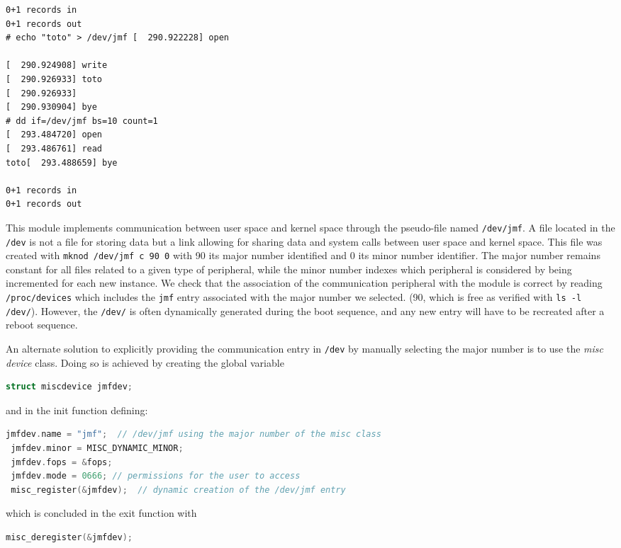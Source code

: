 \documentclass{article}
\begin{document}
{{{\begin{multicols}{2}
{\begin{verbatim}
0+1 records in
0+1 records out
# echo "toto" > /dev/jmf [  290.922228] open

[  290.924908] write 
[  290.926933] toto
[  290.926933]  
[  290.930904] bye
# dd if=/dev/jmf bs=10 count=1
[  293.484720] open
[  293.486761] read
toto[  293.488659] bye

0+1 records in
0+1 records out
\end{verbatim}
}
\end{multicols}


This module implements communication between user space and kernel space through the pseudo-file
named {\tt /dev/jmf}. A file located in the {\tt /dev} is not a file for storing data but a link
allowing for sharing data and system calls between user space and kernel space. This file was created
with {\tt mknod /dev/jmf c 90 0} with 90 its major number identified and 0 its minor number identifier.
The major number remains constant for all files related to a given type of peripheral, while the
minor number indexes which peripheral is considered by being incremented for each new instance.
We check that the association of the communication peripheral with the module is correct by reading
{\tt /proc/devices} which includes the {\tt jmf} entry associated with the major number we selected.
(90, which is free as verified with {\tt ls -l /dev/}). However, the {\tt /dev/} is often dynamically
generated during the boot sequence, and any new entry will have to be recreated after a reboot sequence.

An alternate solution to explicitly providing the communication entry in {\tt /dev} by manually selecting
the major number is to use the {\em misc device} class. Doing so is achieved by creating the global variable
\begin{lstlisting}[language=C]
 struct miscdevice jmfdev;
\end{lstlisting}
and in the init function defining:
\begin{lstlisting}[language=C]
 jmfdev.name = "jmf";  // /dev/jmf using the major number of the misc class
 jmfdev.minor = MISC_DYNAMIC_MINOR;
 jmfdev.fops = &fops;
 jmfdev.mode = 0666; // permissions for the user to access
 misc_register(&jmfdev);  // dynamic creation of the /dev/jmf entry
\end{lstlisting}
which is concluded in the exit function with
\begin{lstlisting}[language=C]
 misc_deregister(&jmfdev);
\end{lstlisting}

}}}
\end{document}
